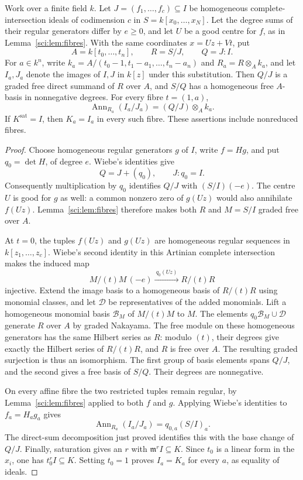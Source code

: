 \begin{lemma}
\label{sci:lem:residual-free}
Work over a finite field \(k\). Let \(J=(f_1,\ldots,f_c)\subseteq I\)
be homogeneous complete-intersection ideals of codimension \(c\) in
\(S=k[x_0,\ldots,x_N]\). Let the degree sums of their regular
generators differ by \(e\geq0\), and let \(U\) be a good centre
for \(f\), as in Lemma~\ref{sci:lem:fibres}. With the same coordinates
\(x=Uz+Vt\), put
\[
 A=k[t_0,\ldots,t_n],\qquad R=S/J,\qquad Q=J:I.
\]
For \(a\in k^n\), write
\(k_a=A/(t_0-1,t_1-a_1,\ldots,t_n-a_n)\) and
\(R_a=R\otimes_A k_a\), and let \(I_a,J_a\)
denote the images of \(I,J\) in \(k[z]\) under this substitution.
Then \(Q/J\) is a graded free direct summand of \(R\) over \(A\),
and \(S/Q\) has a homogeneous free \(A\)-basis in nonnegative
degrees. For every fibre \(t=(1,a)\),
\[
 \operatorname{Ann}_{R_a}(I_a/J_a)
       =(Q/J)\otimes_A k_a.
\]
If \(K^{\mathrm{sat}}=I\), then \(K_a=I_a\) in every such fibre.
These assertions include nonreduced fibres.
\end{lemma}
\begin{proof}
Choose homogeneous regular generators \(g\) of \(I\), write
\(f=Hg\), and put \(q_0=\det H\), of degree \(e\).
Wiebe's identities give
\[
 Q=J+(q_0),\qquad J:q_0=I.
\]
Consequently multiplication by \(q_0\) identifies \(Q/J\) with
\((S/I)(-e)\). The centre \(U\) is good for \(g\) as well:
a common nonzero zero of \(g(Uz)\) would also annihilate \(f(Uz)\).
Lemma~\ref{sci:lem:fibres} therefore makes both \(R\) and
\(M=S/I\) graded free over \(A\).

At \(t=0\), the tuples \(f(Uz)\) and \(g(Uz)\) are homogeneous
regular sequences in \(k[z_1,\ldots,z_c]\). Wiebe's second identity
in this Artinian complete intersection makes the induced map
\[
 M/(t)M\,(-e)\xrightarrow{\ q_0(Uz)\ } R/(t)R
\]
injective. Extend the image basis to a homogeneous basis of \(R/(t)R\)
using monomial classes, and let \(\mathcal D\) be representatives
of the added monomials. Lift a homogeneous monomial basis \(\mathcal B_M\)
of \(M/(t)M\) to \(M\). The elements
\(q_0\mathcal B_M\cup\mathcal D\) generate \(R\) over \(A\)
by graded Nakayama. The free module on these homogeneous generators
has the same Hilbert series as \(R\): modulo \((t)\), their degrees
give exactly the Hilbert series of \(R/(t)R\), and \(R\) is free
over \(A\). The resulting graded surjection is thus an isomorphism.
The first group of basis elements spans \(Q/J\), and the second
gives a free basis of \(S/Q\). Their degrees are nonnegative.

On every affine fibre the two restricted tuples remain regular,
by Lemma~\ref{sci:lem:fibres} applied to both \(f\) and \(g\).
Applying Wiebe's identities to \(f_a=H_a g_a\) gives
\[
 \operatorname{Ann}_{R_a}(I_a/J_a)=q_{0,a}(S/I)_a.
\]
The direct-sum decomposition just proved identifies this with the
base change of \(Q/J\). Finally, saturation gives an \(r\) with
\(\mathfrak m^r I\subseteq K\). Since \(t_0\) is a linear form
in the \(x_i\), one has \(t_0^r I\subseteq K\). Setting \(t_0=1\)
proves \(I_a=K_a\) for every \(a\), as equality of ideals.
\end{proof}

